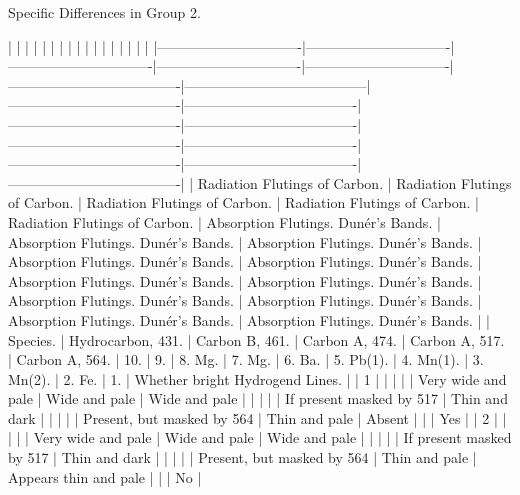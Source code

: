 \documentclass[a4paper, 12pt, oneside, polutonikogreek, english]{article}
\begin{document}
Specific Differences in Group 2.

|                |                |                |                |                |                   |                    |                   |                   |                   |                   |                   |                   |                   |                   |                   |
|-------------------------------|-------------------------------|-------------------------------|-------------------------------|-------------------------------|-------------------------------------|---------------------------------------|-------------------------------------|-------------------------------------|-------------------------------------|-------------------------------------|-------------------------------------|-------------------------------------|-------------------------------------|-------------------------------------|-------------------------------------|
| Radiation Flutings of Carbon. | Radiation Flutings of Carbon. | Radiation Flutings of Carbon. | Radiation Flutings of Carbon. | Radiation Flutings of Carbon. | Absorption Flutings. Dunér’s Bands. | Absorption Flutings. Dunér’s Bands.  | Absorption Flutings. Dunér’s Bands. | Absorption Flutings. Dunér’s Bands. | Absorption Flutings. Dunér’s Bands. | Absorption Flutings. Dunér’s Bands. | Absorption Flutings. Dunér’s Bands. | Absorption Flutings. Dunér’s Bands. | Absorption Flutings. Dunér’s Bands. | Absorption Flutings. Dunér’s Bands. | Absorption Flutings. Dunér’s Bands. |
| Species.           | Hydrocarbon, 431.       | Carbon B, 461.        | Carbon A, 474.        | Carbon A, 517.        | Carbon A, 564.           | 10.                  | 9.                 | 8. Mg.               | 7. Mg.               | 6. Ba.               | 5. Pb(1).              | 4. Mn(1).              | 3. Mn(2).              | 2. Fe.               | 1.                 | Whether bright Hydrogend Lines. |
| 1               | |               | |               | Very wide and pale      | Wide and pale         | Wide and pale            | |                   | |                  | If present masked by 517      | Thin and dark            | |                  | |                  | Present, but masked by 564     | Thin and pale            | Absent               | |                  | Yes               |
| 2               | |               | |               | Very wide and pale      | Wide and pale         | Wide and pale            | |                   | |                  | If present masked by 517      | Thin and dark            | |                  | |                  | Present, but masked by 564     | Thin and pale            | Appears thin and pale        | |                  | No               |
\end{document}
